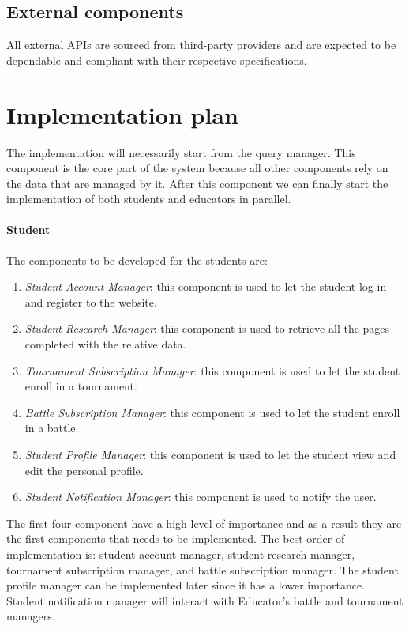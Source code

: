 \documentclass[12pt, a4paper]{report}
\begin{document}
    \subsection{External components}
    All external APIs are sourced from third-party providers and are expected to be dependable and compliant with their respective specifications.

    \section{Implementation plan}
    The implementation will necessarily start from the query manager. 
    This component is the core part of the system because all other components rely on the data that are managed by it. 
    After this component we can finally start the implementation of both students and educators in parallel. 
    
    \paragraph*{Student}
    The components to be developed for the students are: 
    \begin{enumerate}
        \item \textit{Student Account Manager}: this component is used to let the student log in and register to the website. 
        \item \textit{Student Research Manager}: this component is used to retrieve all the pages completed with the relative data. 
        \item \textit{Tournament Subscription Manager}: this component is used to let the student enroll in a tournament.  
        \item \textit{Battle Subscription Manager}: this component is used to let the student enroll in a battle.  
        \item \textit{Student Profile Manager}: this component is used to let the student view and edit the personal profile.
        \item \textit{Student Notification Manager}: this component is used to notify the user. 
    \end{enumerate}
    The first four component have a high level of importance and as a result they are the first components that needs to be implemented. 
    The best order of implementation is: student account manager, student research manager, tournament subscription manager, and battle subscription manager. 
    The student profile manager can be implemented later since it has a lower importance. 
    Student notification manager will interact with Educator's battle and tournament managers. 
\end{document}

